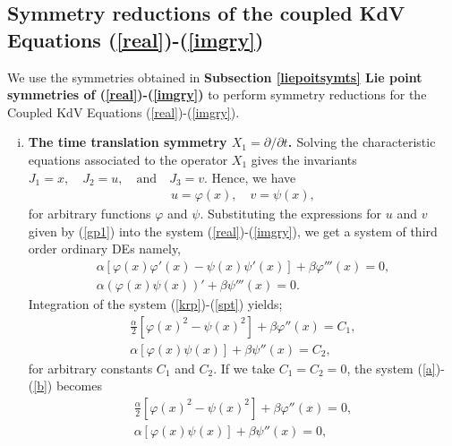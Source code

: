\subsection{Symmetry reductions of the coupled KdV Equations (\ref{real})-(\ref{imgry})}
We use the symmetries obtained in \textbf{Subsection \ref{liepoitsymts} Lie point symmetries of (\ref{real})-(\ref{imgry})} to perform symmetry reductions for the Coupled KdV Equations (\ref{real})-(\ref{imgry}).
\begin{enumerate} [(i)]
\item  \textbf{The  time translation symmetry $X_1 = { \partial } /{ \partial t}$. \label{stat}} \newline
Solving the characteristic equations associated to the operator $X_1$ gives the  invariants \newline$J_1 =x, \quad  J_2 = u,\quad \text{and} \quad  J_3 =v.$
 Hence, we have
 \begin{align}
 \label{gp1}	u =\varphi(x), \quad 	 v= \psi(x), 
 \end{align} for arbitrary functions $\varphi $ and  $\psi $. Substituting  the expressions  for $u$
and $v$ given by (\ref{gp1}) into the system (\ref{real})-(\ref{imgry}), we get a system of third order ordinary DEs namely, 
\begin{align} \alpha \left[  \label{krp}\varphi(x) \varphi'(x)- \psi(x) \psi'(x) \right] + \beta \varphi'''(x)=0,\\
\alpha \left( \varphi(x) \psi(x) \right)' + \beta \psi'''(x)=0. \label{spt}\end{align}
Integration of the system (\ref{krp})-(\ref{spt}) yields;
\begin{align}
\label{a} \frac{\alpha}{2}\left[  \varphi(x)^2- \psi(x)^2  \right] + \beta \varphi''(x)=C_1,\\
\label{b} \alpha \left[ \varphi(x) \psi(x)\right] + \beta \psi''(x)=C_2,
\end{align} for arbitrary constants $C_1$ and $C_2$.
If we take $C_1=C_2=0$, the system (\ref{a})-(\ref{b}) becomes   \begin{align}
\label{a1} \frac{\alpha}{2}\left[  \varphi(x)^2- \psi(x)^2  \right] + \beta \varphi''(x)=0,\\
\label{b1} \alpha \left[ \varphi(x) \psi(x)\right] + \beta \psi''(x)=0,
\end{align}


\end{enumerate}

